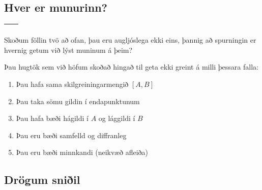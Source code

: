 \documentclass[a4paper,10pt,icelandic]{sphinxmanual}
\begin{document}
\subsection{Hver er munurinn?}
\label{\detokenize{kafli05:hver-er-munurinn}}

\begin{savenotes}\sphinxattablestart
\centering
\begin{tabulary}{\linewidth}[t]{|T|T|}
\hline
{}\label{\detokenize{kafli05:figa}}
&\label{\detokenize{kafli05:figb}}
\\
\hline
\end{tabulary}
\par
\sphinxattableend\end{savenotes}

Skoðum föllin tvö að ofan, þau eru augljóslega ekki eins, þannig að
spurningin er hvernig getum við lýst muninum á þeim?

Þau hugtök sem við höfum skoðað hingað til geta ekki greint á milli
þessara falla:
\begin{enumerate}
\item {} 
Þau hafa sama skilgreiningarmengið \([A,B]\)

\item {} 
Þau taka sömu gildin í endapunktunum

\item {} 
Þau hafa bæði hágildi í \(A\) og lággildi í \(B\)

\item {} 
Þau eru bæði samfelld og diffranleg

\item {} 
Þau eru bæði minnkandi (neikvæð afleiða)

\end{enumerate}


\subsection{Drögum sniðil}
\label{\detokenize{kafli05:drogum-sniil}}
\end{document}
